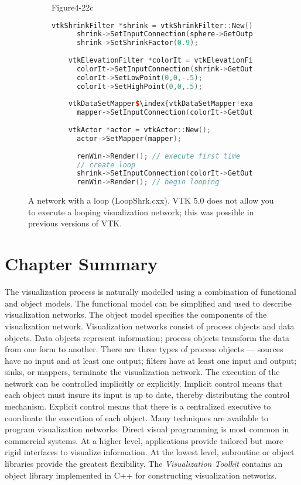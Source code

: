 \begin{description}[leftmargin=0cm,labelindent=0cm]
\begin{figure}[htb]
\begin{subfigure}[h]{0.96\linewidth}{Figure4-22c}
\begin{lstlisting}[language=C++, caption={Warped Sphere.}, escapechar=\$]
    vtkShrinkFilter *shrink = vtkShrinkFilter::New();
      shrink->SetInputConnection(sphere->GetOutputPort());
      shrink->SetShrinkFactor(0.9);
    
    vtkElevationFilter *colorIt = vtkElevationFilter::New();
      colorIt->SetInputConnection(shrink->GetOutputPort());
      colorIt->SetLowPoint(0,0,-.5);
      colorIt->SetHighPoint(0,0,.5);
    
    vtkDataSetMapper$\index{vtkDataSetMapper!example}$ *mapper = vtkDataSetMapper::New();
      mapper->SetInputConnection(colorIt->GetOutputPort());
    
    vtkActor *actor = vtkActor::New();
      actor->SetMapper(mapper);
    
      renWin->Render(); // execute first time
      // create loop
      shrink->SetInputConnection(colorIt->GetOutputPort());
      renWin->Render(); // begin looping
    \end{lstlisting}
    \caption*{}
  \end{subfigure}
  \caption{A network with a loop (LoopShrk.cxx). VTK 5.0 does not allow you to execute a looping visualization network; this was possible in previous versions of VTK.}\label{fig:Figure4-22}
\end{figure}

\end{description}

\section{Chapter Summary}

The visualization process is naturally modelled using a combination of functional and object models. The functional model can be simplified and used to describe visualization networks. The object model specifies the components of the visualization network. Visualization networks consist of process objects and data objects. Data objects represent information; process objects transform the data from one form to another. There are three types of process objects --- sources have no input and at least one output; filters have at least one input and output; sinks, or mappers, terminate the visualization network. The execution of the network can be controlled implicitly or explicitly. Implicit control means that each object must insure its input is up to date, thereby distributing the control mechanism. Explicit control means that there is a centralized executive to coordinate the execution of each object. Many techniques are available to program visualization networks. Direct visual programming is most common in commercial systems. At a higher level, applications provide tailored but more rigid interfaces to visualize information. At the lowest level, subroutine or object libraries provide the greatest flexibility. The \emph{Visualization Toolkit} contains an object library implemented in C++ for constructing visualization networks.

